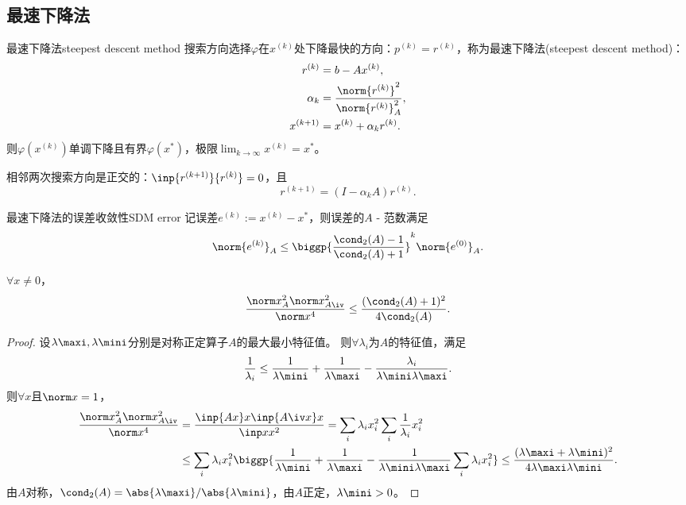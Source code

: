 \subsection{最速下降法}
\label{ssec:steepest descent method}

\begin{theorem}
    {最速下降法}{steepest descent method}
    搜索方向选择$\varphi$在$x^{(k)}$处下降最快的方向：$p^{(k)}=r^{(k)}$，称为最速下降法(steepest descent method)：
    \begin{subequations}
        \begin{align}
            r^{(k)}&=b-Ax^{(k)},\\
            \alpha_k&=\frac{\norm{r^{(k)}}^2}{\norm{r^{(k)}}_A^2},\\
            x^{(k+1)}&=x^{(k)}+\alpha_kr^{(k)}.
        \end{align}
    \end{subequations}
    则$\varphi(x^{(k)})$单调下降且有界$\varphi(x^*)$，极限$\lim_{k\to\infty}x^{(k)}=x^*$。
\end{theorem}

\begin{corollary}
    相邻两次搜索方向是正交的：$\inp{r^{(k+1)}}{r^{(k)}}=0$，且
    \[
        r^{(k+1)}=(I-\alpha_k A)r^{(k)}.
    \]
\end{corollary}

\begin{theorem}
    {最速下降法的误差收敛性}{SDM error}
    记误差$e^{(k)}:=x^{(k)}-x^*$，则误差的$A$ - 范数满足
    \begin{equation}
        \label{eqn:SDM e^k}
        \norm{e^{(k)}}_A\leq\biggp{\frac{\cond_2(A)-1}{\cond_2(A)+1}}^k\norm{e^{(0)}}_A.
    \end{equation}
\end{theorem}

\begin{lemma}
    $\forall x\neq 0$，
    \begin{equation}
        \frac{\norm x_A^2\norm x_{A\iv}^2}{\norm x^4}\leq\frac{(\cond_2(A)+1)^2}{4\cond_2(A)}.
    \end{equation}
\end{lemma}

\begin{proof}
    设$\lambda\maxi,\lambda\mini$分别是对称正定算子$A$的最大最小特征值。
    则$\forall\lambda_i$为$A$的特征值，满足
    \[
        \frac1{\lambda_i}\leq\frac1{\lambda\mini}+\frac1{\lambda\maxi}-\frac{\lambda_i}{\lambda\mini\lambda\maxi}.
    \]
    则$\forall x$且$\norm x=1$，
    \begin{align*}
        \frac{\norm x_A^2\norm x_{A\iv}^2}{\norm x^4}&=\frac{\inp{Ax}x\inp{A\iv x}x}{\inp xx^2}=\sum_i\lambda_ix_i^2\sum_i\frac1{\lambda_i}x_i^2\\
        &\leq\sum_i\lambda_ix_i^2\biggp{\frac1{\lambda\mini}+\frac1{\lambda\maxi}-\frac1{\lambda\mini\lambda\maxi}\sum_i\lambda_ix_i^2}\leq\frac{(\lambda\maxi+\lambda\mini)^2}{4\lambda\maxi\lambda\mini}.
    \end{align*}
    由$A$对称，$\cond_2(A)=\abs{\lambda\maxi}/\abs{\lambda\mini}$，由$A$正定，$\lambda\mini>0$。
\end{proof}

